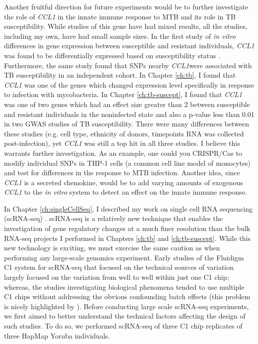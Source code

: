 Another fruitful direction for future experiments would be to further
investigate the role of \emph{CCL1} in the innate immune response to
MTB and its role in TB susceptibility. While studies of this gene have
had mixed results, all the studies, including my own, have had small
sample sizes. In the first study of \emph{in vitro} differences in
gene expression between susceptible and resistant individuals,
\emph{CCL1} was found to be differentially expressed based on
susceptibility status \citep{Thuoung2008}. Furthermore, the same study
found that SNPs nearby \emph{CCL1}were associated with TB
susceptibility in an independent cohort. In Chapter \ref{ch:tb}, I
found that \emph{CCL1} was one of the genes which changed expression
level specifically in response to infection with mycobacteria. In
Chapter \ref{ch:tb-suscept}, I found that \emph{CCL1} was one of two
genes which had an effect size greater than 2 between susceptible and
resistant individuals in the noninfected state and also a p-value less
than 0.01 in two GWAS studies of TB susceptibility. There were many
differences between these studies (e.g. cell type, ethnicity of
donors, timepoints RNA was collected post-infection), yet \emph{CCL1}
was still a top hit in all three studies. I believe this warrants
further investigation. As an example, one could you CRISPR/Cas to
modify individual SNPs in THP-1 cells (a common cell line model of
monocytes) and test for differences in the response to MTB
infection. Another idea, since \emph{CCL1} is a secreted chemokine,
would be to add varying amounts of exogenous \emph{CCL1} to the
\emph{in vitro} system to detect an effect on the innate immune
response.

In Chapter \ref{ch:singleCellSeq}, I described my work on single cell
RNA sequencing (scRNA-seq) \citep{Tung2016}. scRNA-seq is a relatively
new technique that enables the investigation of gene regulatory
changes at a much finer resolution than the bulk RNA-seq projects I
performed in Chapters \ref{ch:tb} and \ref{ch:tb-suscept}. While this
new technology is exciting, we must exercise the same caution as when
performing any large-scale genomics experiment. Early studies of the
Fluidigm C1 system for scRNA-seq that focused on the technical sources
of variation largely focused on the variation from well to well within
just one C1 chip; whereas, the studies investigating biological
phenomena tended to use multiple C1 chips without addressing the
obvious confounding batch effects (this problem is nicely highlighted
by \citep{Hicks2015}). Before conducting large scale scRNA-seq
experiments, we first aimed to better understand the technical factors
affecting the design of such studies. To do so, we performed scRNA-seq
of three C1 chip replicates of three HapMap Yoruba individuals.

